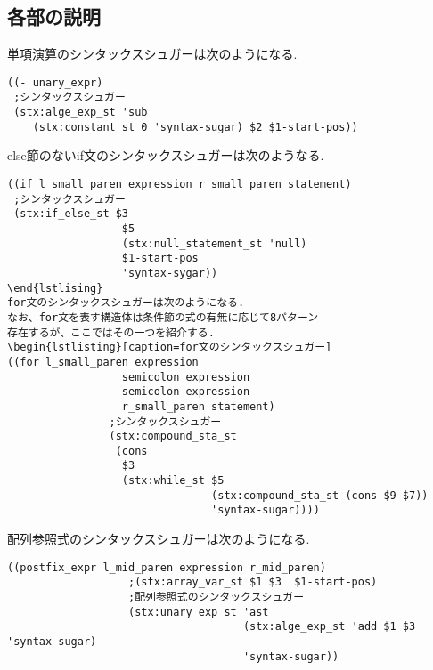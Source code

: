 \documentclass[a4j,dvipdfmx]{jarticle}
\begin{document}
\subsection{各部の説明}
単項演算のシンタックスシュガーは次のようになる.
\begin{lstlisting}[caption=単項演算のシンタックスシュガー]
((- unary_expr)
 ;シンタックスシュガー
 (stx:alge_exp_st 'sub 
    (stx:constant_st 0 'syntax-sugar) $2 $1-start-pos))
\end{lstlisting}

else節のないif文のシンタックスシュガーは次のようなる.
\begin{lstlisting}[caption=if文のシンタックスシュガー]
((if l_small_paren expression r_small_paren statement)
 ;シンタックスシュガー
 (stx:if_else_st $3 
                  $5 
                  (stx:null_statement_st 'null) 
                  $1-start-pos 
                  'syntax-sygar))
\end{lstlising}
for文のシンタックスシュガーは次のようになる.
なお、for文を表す構造体は条件節の式の有無に応じて8パターン
存在するが、ここではその一つを紹介する.
\begin{lstlisting}[caption=for文のシンタックスシュガー]
((for l_small_paren expression 
                  semicolon expression 
                  semicolon expression 
                  r_small_paren statement)
                ;シンタックスシュガー   
                (stx:compound_sta_st 
                 (cons 
                  $3
                  (stx:while_st $5 
                                (stx:compound_sta_st (cons $9 $7)) 
                                'syntax-sugar))))
\end{lstlisting}
配列参照式のシンタックスシュガーは次のようになる.
\begin{lstlisting}[caption=配列参照式のシンタックスシュガー]
((postfix_expr l_mid_paren expression r_mid_paren)
                   ;(stx:array_var_st $1 $3  $1-start-pos)
                   ;配列参照式のシンタックスシュガー
                   (stx:unary_exp_st 'ast 
                                     (stx:alge_exp_st 'add $1 $3 'syntax-sugar) 
                                     'syntax-sugar))
\end{lstlisting}
\end{document}
